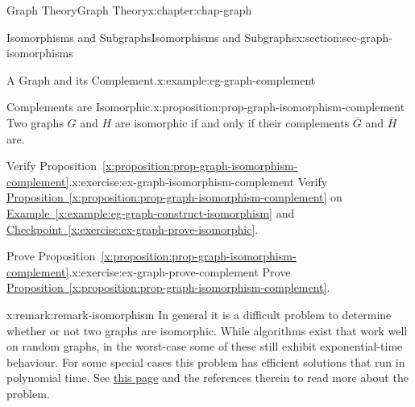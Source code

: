 \documentclass[oneside,10pt,]{book}
\newcommand{\xreffont}{\relax}
\numberwithin{equation}{section}
\begin{document}
\begin{chapterptx}{Graph Theory}{}{Graph Theory}{}{}{x:chapter:chap-graph}
\begin{sectionptx}{Isomorphisms and Subgraphs}{}{Isomorphisms and Subgraphs}{}{}{x:section:sec-graph-isomorphisms}
\begin{example}{A Graph and its Complement.}{x:example:eg-graph-complement}
\begin{sidebyside}{3}{0.15}{0.15}{0.02}
\begin{sbspanel}{0.22}
{
}%
\end{sbspanel}%
\end{sidebyside}%
\end{example}
\begin{proposition}{Complements are Isomorphic.}{}{x:proposition:prop-graph-isomorphism-complement}%
Two graphs \(G\) and \(H\) are isomorphic if and only if their complements \(\overline{G}\) and \(\overline{H}\) are.%
\end{proposition}
\begin{inlineexercise}{Verify Proposition~{\xreffont\ref*{x:proposition:prop-graph-isomorphism-complement}}.}{x:exercise:ex-graph-isomorphism-complement}%
Verify \hyperref[x:proposition:prop-graph-isomorphism-complement]{Proposition~{\xreffont\ref{x:proposition:prop-graph-isomorphism-complement}}} on \hyperref[x:example:eg-graph-construct-isomorphism]{Example~{\xreffont\ref{x:example:eg-graph-construct-isomorphism}}} and \hyperref[x:exercise:ex-graph-prove-isomorphic]{Checkpoint~{\xreffont\ref{x:exercise:ex-graph-prove-isomorphic}}}.%
\end{inlineexercise}%
\begin{inlineexercise}{Prove Proposition~{\xreffont\ref*{x:proposition:prop-graph-isomorphism-complement}}.}{x:exercise:ex-graph-prove-complement}%
Prove \hyperref[x:proposition:prop-graph-isomorphism-complement]{Proposition~{\xreffont\ref{x:proposition:prop-graph-isomorphism-complement}}}.%
\end{inlineexercise}%
\begin{remark}{}{x:remark:remark-isomorphism}%
In general it is a difficult problem to determine whether or not two graphs are isomorphic. While algorithms exist that work well on random graphs, in the worst-case some of these still exhibit exponential-time behaviour. For some special cases this problem has efficient solutions that run in polynomial time. See \href{https://en.wikipedia.org/wiki/Graph_Isomorphism_Problem}{this page} and the references therein to read more about the problem.%
\end{remark}
\end{sectionptx}

\end{chapterptx}
\end{document}
